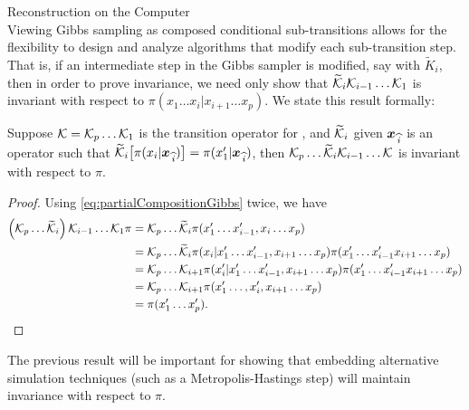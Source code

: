 \begin{chapter}{Reconstruction on the Computer}
\begin{equation}
\end{equation}
Viewing Gibbs sampling as composed conditional sub-transitions allows for the flexibility to design and analyze algorithms that modify each sub-transition step. 
That is, if an intermediate step in the Gibbs sampler is modified, say with $\tilde K_i$, then in order to prove invariance, we need only show that $\widetilde {\mathcal K}_i\mathcal K_{i-1}\dots\mathcal K_1$ is invariant with respect to $\pi(x_1\dots x_i|x_{i+1}\dots x_p)$.
We state this result formally:
\begin{cor}
  Suppose $\mathcal K = \mathcal K_p\dots\mathcal K_1$ is the transition operator for , and $\widetilde {\mathcal K}_i$ given $\mbox{\boldmath$x$}_{\,\widehat{i}}$ is an operator such that $\widetilde {\mathcal K}_i \big[\pi(x_i|\mbox{\boldmath$x$}_{\,\widehat{i}})\big] = \pi(x_1'|\mbox{\boldmath$x$}_{\,\widehat{i}})$, then $\mathcal K_p\dots\widetilde {\mathcal K}_i\mathcal K_{i-1}\dots\mathcal K$ is invariant with respect to $\pi$.
\end{cor}
\begin{proof} 
  Using \eqref{eq:partialCompositionGibbs} twice, we have 
  \begin{align}
    \left(\mathcal K_p\dots\widetilde {\mathcal K}_i\right)\mathcal K_{i-1}\dots\mathcal K_1 \pi 
      &= \mathcal K_p\dots \widetilde {\mathcal K}_i \pi(x_1'\dots x_{i-1}',x_i\dots x_p) \nonumber\\
      &= \mathcal K_p\dots \widetilde {\mathcal K}_i \pi(x_i|x_1'\dots x_{i-1}',x_{i+1}\dots x_p)\pi(x_1'\dots x_{i-1}'x_{i+1}\dots x_p) \nonumber\\
      &= \mathcal K_p\dots \mathcal K_{i+1}\pi(x_i'|x_1'\dots x_{i-1}',x_{i+1}\dots x_p)\pi(x_1'\dots x_{i-1}'x_{i+1}\dots x_p) \nonumber\\
      &= \mathcal K_p\dots \mathcal K_{i+1}\pi(x_1'\dots ,x_i',x_{i+1}\dots x_p) \nonumber\\
      &= \pi(x_1'\dots x_p').
  \end{align}
\end{proof}
The previous result will be important for showing that embedding alternative simulation techniques (such as a Metropolis-Hastings step) will maintain invariance with respect to $\pi$.


\end{chapter}
